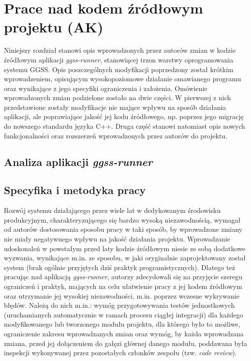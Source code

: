 \chapter{Prace nad kodem źródłowym projektu (AK)}
\label{cha:code}

\graphicspath{{5_code/static/}}

Niniejszy rozdział stanowi opis wprowadzonych przez autorów zmian w kodzie źródłowym aplikacji \emph{ggss-runner}, stanowiącej trzon warstwy oprogramowania systemu GGSS. Opis poszczególnych modyfikacji poprzedzony został krótkim wprowadzeniem, opisującym wysokopoziomowe działanie omawianego programu oraz wynikające z jego specyfiki ograniczenia i założenia. Omówienie wprowadzonych zmian podzielone zostało na dwie części. W pierwszej z nich przedstawione zostały modyfikacje nie mające wpływu na sposób działania aplikacji, ale poprawiające jakość jej kodu źródłowego, np. poprzez jego migrację do nowszego standardu języka C++. Druga część stanowi natomiast opis nowych funkcjonalności oraz rozszerzeń wprowadzonych przez autorów do projektu. 

\section{Analiza aplikacji \emph{ggss-runner}}

\clearpage
\section{Specyfika i metodyka pracy}
Rozwój systemu działającego przez wiele lat w dedykowanym środowisku produkcyjnym, charakteryzującego się bardzo wysoką niezawodnością, wymagał od autorów dostosowania sposobu pracy w taki sposób, by wprowadzone zmiany nie miały negatywnego wpływu na jakość działania projektu. Wprowadzanie udoskonaleń w powstałym przed laty kodzie źródłowym niesie ze sobą dodatkowe wyzwania, wynikające m.in. ze sposobu, w jaki oryginalnie zaprojektowany został system (brak ogólnie przyjętych dziś praktyk programistycznych). Dlatego też pracując nad aplikacją \emph{ggss-runner}, autorzy zdecydowali się na przyjęcie szeregu ograniczeń i praktyk, mających na celu ułatwienie pracy z jej kodem źródłowym oraz utrzymanie jej wysokiej niezawodności, m.in. poprzez wczesne wykrywanie błędów. Należą do nich m.in.: wymóg przygotowywania testów jednostkowych (uruchamianych automatycznie w ramach procesu ciągłej integracji) dla każdego modyfikowanego lub tworzonego modułu projektu, dla którego było to możliwe, ograniczenie zakresu wprowadzanych zmian oraz wymóg, by każda wprowadzana zmiana, przed jej dołączeniem do gałęzi głównej danego modułu, poddawana była inspekcji wykonywanej przez pozostałych członków zespołu (tzw. \emph{code review}).



